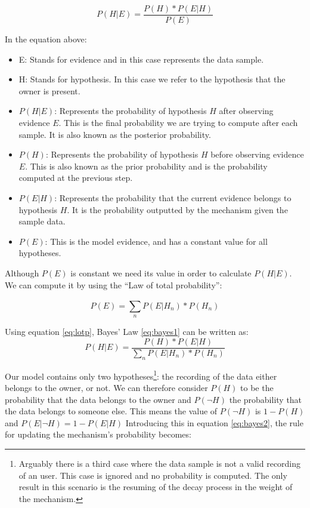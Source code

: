 \begin{equation} 
\label{eq:bayes1}
P(H|E) = \frac{P(H) * P(E|H)}{P(E)}
\end{equation}

In the equation above:
\begin{itemize} 
	\item E: Stands for evidence and in this case represents the data sample.
	\item H: Stands for hypothesis. In this case we refer to the hypothesis that the owner is present.
	\item $P(H|E)$: Represents the probability of hypothesis $H$ after observing evidence $E$. This is the final probability we are trying to compute after each sample. It is also known as the posterior probability. 
	\item $P(H)$: Represents the probability of hypothesis $H$ before observing evidence $E$. This is also known as the prior probability and is the probability computed at the previous step.
	\item $P(E|H)$: Represents the probability that the current evidence belongs to hypothesis $H$. It is the probability outputted by the mechanism given the sample data.
	\item $P(E)$: This is the model evidence, and has a constant value for all hypotheses.
\end{itemize}

Although $P(E)$ is constant we need its value in order to calculate $P(H|E)$. We can compute it by using the ``Law of total probability'':

\begin{equation} 
\label{eq:lotp}
P(E) = \sum_{n}^{}P(E|H_n) * P(H_n)
\end{equation}

Using equation \ref{eq:lotp}, Bayes' Law \ref{eq:bayes1} can be written as:
\begin{equation} 
\label{eq:bayes2}
P(H|E) = \frac{P(H) * P(E|H)}{\sum_{n}^{}P(E|H_n) * P(H_n)}
\end{equation}

Our model contains only two hypotheses\footnote{Arguably there is a third case where the data sample is not a valid recording of an user. This case is ignored and no probability is computed. The only result in this scenario is the resuming of the decay process in the weight of the mechanism.}: the recording of the data either belongs to the owner, or not. We can therefore consider $P(H)$ to be the probability that the data belongs to the owner and $P(\neg H)$ the probability that the data belongs to someone else. This means the value of $P(\neg H)$ is $1 - P(H)$ and $P(E|\neg H) = 1 - P(E|H)$ Introducing this in equation \ref{eq:bayes2}, the rule for updating the mechanism's probability becomes:


